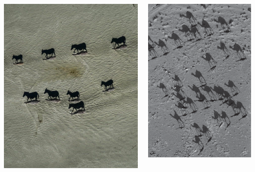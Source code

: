 \documentclass[11pt,dvipsnames,ignorenonframetext,aspectratio=169]{beamer}
\newcommand{\bcolumns}{\begin{columns}[T, onlytextwidth]}
\newcommand{\ecolumns}{\end{columns}}
\begin{document}
\begin{frame}{}
\protect\hypertarget{section-4}{}
\bcolumns
{}

\includegraphics[width=0.64\linewidth]{../images/zebra_herd_super_big}


\includegraphics[width=0.62\linewidth]{../images/camel_vertical}

\ecolumns
\end{frame}
\end{document}
